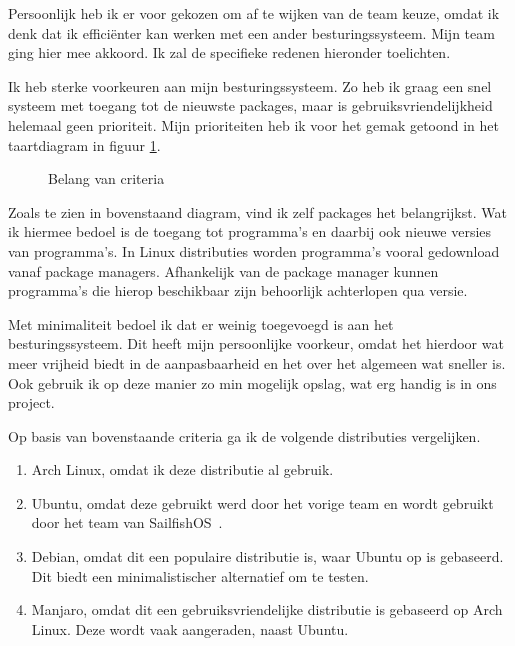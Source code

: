 \documentclass[a4paper]{report}
\begin{document}
Persoonlijk heb ik er voor gekozen om af te wijken van de team keuze, omdat ik denk dat ik efficiënter kan werken met een ander besturingssysteem.
Mijn team ging hier mee akkoord. Ik zal de specifieke redenen hieronder toelichten.
\par\smallskip
Ik heb sterke voorkeuren aan mijn besturingssysteem. Zo heb ik graag een snel systeem met toegang tot de nieuwste packages, maar is gebruiksvriendelijkheid helemaal geen prioriteit.
Mijn prioriteiten heb ik voor het gemak getoond in het taartdiagram in figuur \ref{graph:spec_percentages}.
\begin{figure}[H]
  \centering
{}
\caption{Belang van criteria}
\label{graph:spec_percentages}
\end{figure}

Zoals te zien in bovenstaand diagram, vind ik zelf packages het belangrijkst. 
Wat ik hiermee bedoel is de toegang tot programma's en daarbij ook nieuwe versies van programma's.
In Linux distributies worden programma's vooral gedownload vanaf package managers. Afhankelijk van de package manager kunnen programma's die hierop beschikbaar zijn behoorlijk achterlopen qua versie. 
\par\smallskip 
Met minimaliteit bedoel ik dat er weinig toegevoegd is aan het besturingssysteem. Dit heeft mijn persoonlijke voorkeur, omdat het hierdoor wat meer vrijheid biedt in de aanpasbaarheid en het over het algemeen wat sneller is. 
Ook gebruik ik op deze manier zo min mogelijk opslag, wat erg handig is in ons project.
\par\smallskip
Op basis van bovenstaande criteria ga ik de volgende distributies vergelijken. 
\begin{enumerate}
  \item Arch Linux, omdat ik deze distributie al gebruik.
  \item Ubuntu, omdat deze gebruikt werd door het vorige team en wordt gebruikt door het team van SailfishOS~\cite{sailfishportingguide}.
  \item Debian, omdat dit een populaire distributie is, waar Ubuntu op is gebaseerd. Dit biedt een minimalistischer alternatief om te testen.
  \item Manjaro, omdat dit een gebruiksvriendelijke distributie is gebaseerd op Arch Linux. Deze wordt vaak aangeraden, naast Ubuntu.
\end{enumerate}
\end{document}
